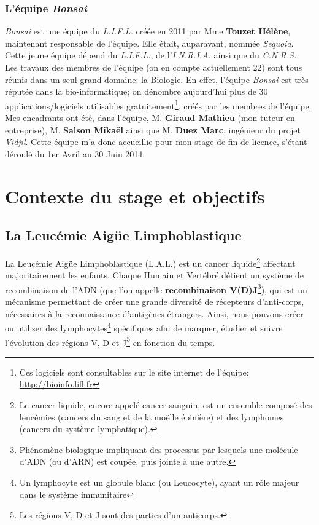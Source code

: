 \documentclass[12pt]{report}
\begin{document}
\begin{spacing}{1.2}
\subsection{L'équipe \textit{Bonsai}}
\textit{Bonsai} est une équipe du \textit{L.I.F.L.} créée en 2011 par Mme \textbf{Touzet Hélène}, maintenant responsable de l'équipe. Elle était, auparavant, nommée \textit{Sequoia}.
\newline
Cette jeune équipe dépend du \textit{L.I.F.L.}, de l'\textit{I.N.R.I.A.} ainsi que du \textit{C.N.R.S.}.
\newline
Les travaux des membres de l'équipe (on en compte actuellement 22) sont tous réunis dans un seul grand domaine: la Biologie.
\newline
En effet, l'équipe \textit{Bonsai} est très réputée dans la bio-informatique; on dénombre aujourd'hui plus de 30 applications/logiciels utilisables gratuitement\footnote{Ces logiciels sont consultables sur le site internet de l'équipe: \url{http://bioinfo.lifl.fr}}, créés par les membres de l'équipe.
\newline
Mes encadrants ont été, dans l'équipe, M. \textbf{Giraud Mathieu} (mon tuteur en entreprise), M. \textbf{Salson Mikaël} ainsi que M. \textbf{Duez Marc}, ingénieur du projet \textit{Vidjil}.
\newline
Cette équipe m'a donc accueillie pour mon stage de fin de licence, s'étant déroulé du 1er Avril au 30 Juin 2014.


\chapter{Contexte du stage et objectifs}

\section{La Leucémie Aigüe Limphoblastique}
La Leucémie Aigüe Limphoblastique (L.A.L.) est un cancer liquide\footnote{Le cancer liquide, encore appelé cancer sanguin, est un ensemble composé des leucémies (cancers du sang et de la moëlle épinière) et des lymphomes (cancers du système lymphatique).} affectant majoritairement les enfants.
\newline
Chaque Humain et Vertébré détient un système de recombinaison de l'ADN (que l'on appelle \textbf{recombinaison V(D)J}\footnote{Phénomène biologique impliquant des processus par lesquels une molécule d'ADN (ou d'ARN) est coupée, puis jointe à une autre.}), qui est un mécanisme permettant de créer une grande diversité de récepteurs d'anti-corps, nécessaires à la reconnaissance d'antigènes étrangers.
\newline
Ainsi, nous pouvons créer ou utiliser des lymphocytes\footnote{Un lymphocyte est un globule blanc (ou Leucocyte), ayant un rôle majeur dans le système immunitaire} spécifiques afin de marquer, étudier et suivre l'évolution des régions V, D et J\footnote{Les régions V, D et J sont des parties d'un anticorps.} en fonction du temps.


\end{spacing}
\end{document}
